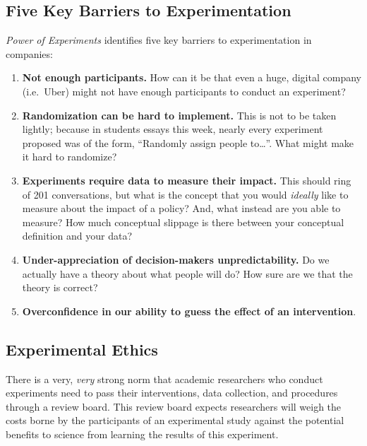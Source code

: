 \documentclass[
]{book}
\providecommand{\tightlist}{%
  \setlength{\itemsep}{0pt}\setlength{\parskip}{0pt}}
\begin{document}
\hypertarget{five-key-barriers-to-experimentation}{%
\subsection{Five Key Barriers to
Experimentation}\label{five-key-barriers-to-experimentation}}

\emph{Power of Experiments} identifies five key barriers to
experimentation in companies:

\begin{enumerate}
\def\labelenumi{\arabic{enumi}.}
\tightlist
\item
  \textbf{Not enough participants.} How can it be that even a huge,
  digital company (i.e.~Uber) might not have enough participants to
  conduct an experiment?
\item
  \textbf{Randomization can be hard to implement.} This is not to be
  taken lightly; because in students essays this week, nearly every
  experiment proposed was of the form, ``Randomly assign people
  to\ldots{}''. What might make it hard to randomize?
\item
  \textbf{Experiments require data to measure their impact.} This should
  ring of 201 conversations, but what is the concept that you would
  \emph{ideally} like to measure about the impact of a policy? And, what
  instead are you able to measure? How much conceptual slippage is there
  between your conceptual definition and your data?\\
\item
  \textbf{Under-appreciation of decision-makers unpredictability.} Do we
  actually have a theory about what people will do? How sure are we that
  the theory is correct?\\
\item
  \textbf{Overconfidence in our ability to guess the effect of an
  intervention}.
\end{enumerate}

\hypertarget{experimental-ethics}{%
\subsection{Experimental Ethics}\label{experimental-ethics}}

There is a very, \emph{very} strong norm that academic researchers who
conduct experiments need to pass their interventions, data collection,
and procedures through a review board. This review board expects
researchers will weigh the costs borne by the participants of an
experimental study against the potential benefits to science from
learning the results of this experiment.
\end{document}
